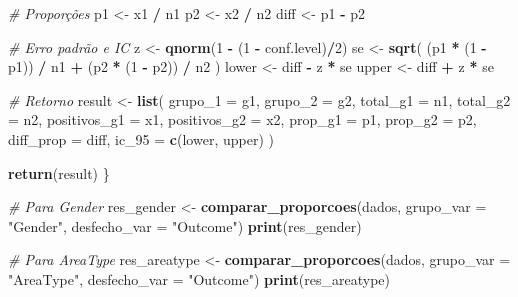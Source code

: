 \documentclass[
]{article}
\newenvironment{Shaded}{\begin{snugshade}}{\end{snugshade}}
\newcommand{\AttributeTok}[1]{\textcolor[rgb]{0.13,0.29,0.53}{#1}}
\newcommand{\CommentTok}[1]{\textcolor[rgb]{0.56,0.35,0.01}{\textit{#1}}}
\newcommand{\DecValTok}[1]{\textcolor[rgb]{0.00,0.00,0.81}{#1}}
\newcommand{\FunctionTok}[1]{\textcolor[rgb]{0.13,0.29,0.53}{\textbf{#1}}}
\newcommand{\NormalTok}[1]{#1}
\newcommand{\OtherTok}[1]{\textcolor[rgb]{0.56,0.35,0.01}{#1}}
\newcommand{\SpecialCharTok}[1]{\textcolor[rgb]{0.81,0.36,0.00}{\textbf{#1}}}
\newcommand{\StringTok}[1]{\textcolor[rgb]{0.31,0.60,0.02}{#1}}
\begin{document}
\begin{Shaded}
\begin{Highlighting}[]
  \CommentTok{\# Proporções}
\NormalTok{  p1 }\OtherTok{\textless{}{-}}\NormalTok{ x1 }\SpecialCharTok{/}\NormalTok{ n1}
\NormalTok{  p2 }\OtherTok{\textless{}{-}}\NormalTok{ x2 }\SpecialCharTok{/}\NormalTok{ n2}
\NormalTok{  diff }\OtherTok{\textless{}{-}}\NormalTok{ p1 }\SpecialCharTok{{-}}\NormalTok{ p2}
  
  \CommentTok{\# Erro padrão e IC}
\NormalTok{  z }\OtherTok{\textless{}{-}} \FunctionTok{qnorm}\NormalTok{(}\DecValTok{1} \SpecialCharTok{{-}}\NormalTok{ (}\DecValTok{1} \SpecialCharTok{{-}}\NormalTok{ conf.level)}\SpecialCharTok{/}\DecValTok{2}\NormalTok{)}
\NormalTok{  se }\OtherTok{\textless{}{-}} \FunctionTok{sqrt}\NormalTok{( (p1 }\SpecialCharTok{*}\NormalTok{ (}\DecValTok{1} \SpecialCharTok{{-}}\NormalTok{ p1)) }\SpecialCharTok{/}\NormalTok{ n1 }\SpecialCharTok{+}\NormalTok{ (p2 }\SpecialCharTok{*}\NormalTok{ (}\DecValTok{1} \SpecialCharTok{{-}}\NormalTok{ p2)) }\SpecialCharTok{/}\NormalTok{ n2 )}
\NormalTok{  lower }\OtherTok{\textless{}{-}}\NormalTok{ diff }\SpecialCharTok{{-}}\NormalTok{ z }\SpecialCharTok{*}\NormalTok{ se}
\NormalTok{  upper }\OtherTok{\textless{}{-}}\NormalTok{ diff }\SpecialCharTok{+}\NormalTok{ z }\SpecialCharTok{*}\NormalTok{ se}
  
  \CommentTok{\# Retorno}
\NormalTok{  result }\OtherTok{\textless{}{-}} \FunctionTok{list}\NormalTok{(}
    \AttributeTok{grupo\_1 =}\NormalTok{ g1,}
    \AttributeTok{grupo\_2 =}\NormalTok{ g2,}
    \AttributeTok{total\_g1 =}\NormalTok{ n1,}
    \AttributeTok{total\_g2 =}\NormalTok{ n2,}
    \AttributeTok{positivos\_g1 =}\NormalTok{ x1,}
    \AttributeTok{positivos\_g2 =}\NormalTok{ x2,}
    \AttributeTok{prop\_g1 =}\NormalTok{ p1,}
    \AttributeTok{prop\_g2 =}\NormalTok{ p2,}
    \AttributeTok{diff\_prop =}\NormalTok{ diff,}
    \AttributeTok{ic\_95 =} \FunctionTok{c}\NormalTok{(lower, upper)}
\NormalTok{  )}
  
  \FunctionTok{return}\NormalTok{(result)}
\NormalTok{\}}

\CommentTok{\# Para Gender}
\NormalTok{res\_gender }\OtherTok{\textless{}{-}} \FunctionTok{comparar\_proporcoes}\NormalTok{(dados, }\AttributeTok{grupo\_var =} \StringTok{"Gender"}\NormalTok{, }\AttributeTok{desfecho\_var =} \StringTok{"Outcome"}\NormalTok{)}
\FunctionTok{print}\NormalTok{(res\_gender)}

\CommentTok{\# Para AreaType}
\NormalTok{res\_areatype }\OtherTok{\textless{}{-}} \FunctionTok{comparar\_proporcoes}\NormalTok{(dados, }\AttributeTok{grupo\_var =} \StringTok{"AreaType"}\NormalTok{, }\AttributeTok{desfecho\_var =} \StringTok{"Outcome"}\NormalTok{)}
\FunctionTok{print}\NormalTok{(res\_areatype)}


\end{Highlighting}
\end{Shaded}
\end{document}
